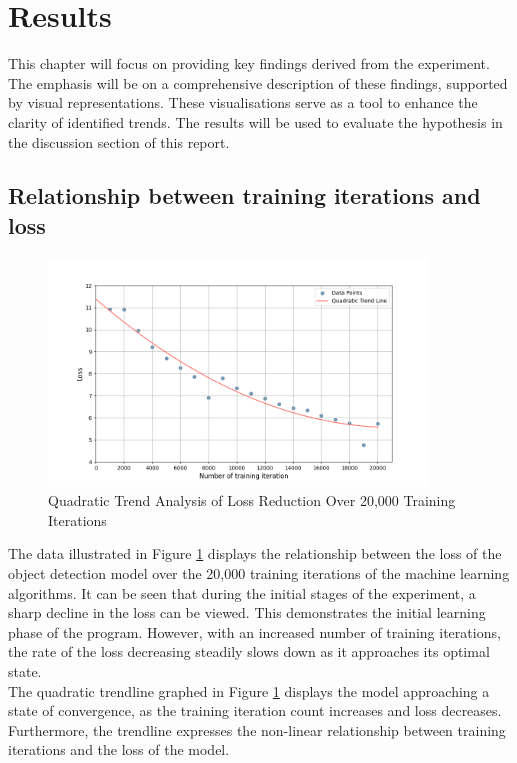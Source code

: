 \section{Results}
This chapter will focus on providing key findings derived from the experiment.
The emphasis will be on a comprehensive description of these findings, supported by visual representations. These visualisations serve
as a tool to enhance the clarity of identified trends. The results will be used to evaluate the hypothesis in the discussion section of this report.\\

\subsection{Relationship between training iterations and loss}
\begin{figure}[h]
   \centering
   \includegraphics[width=0.9\textwidth]{../Data/loss_by_iteration_plot.png}
   \caption{Quadratic Trend Analysis of Loss Reduction Over 20,000 Training Iterations}
   \label{fig:loss-vs-training-iterations}
\end{figure}
The data illustrated in Figure \ref{fig:loss-vs-training-iterations} displays the relationship between the loss of the object detection model over the 20,000 training iterations of the machine learning algorithms. It can be seen that during the initial stages of the experiment, a sharp decline in the loss can be viewed. This demonstrates the initial learning phase of the program. However, with an increased number of training iterations, the rate of the loss decreasing steadily slows down as it approaches its optimal state. \\ 

The quadratic trendline graphed in Figure \ref{fig:loss-vs-training-iterations}  displays the model approaching a state of convergence, as the training iteration count increases and loss decreases. Furthermore, the trendline expresses the non-linear relationship between training iterations and the loss of the model. \\ 
\newpage

